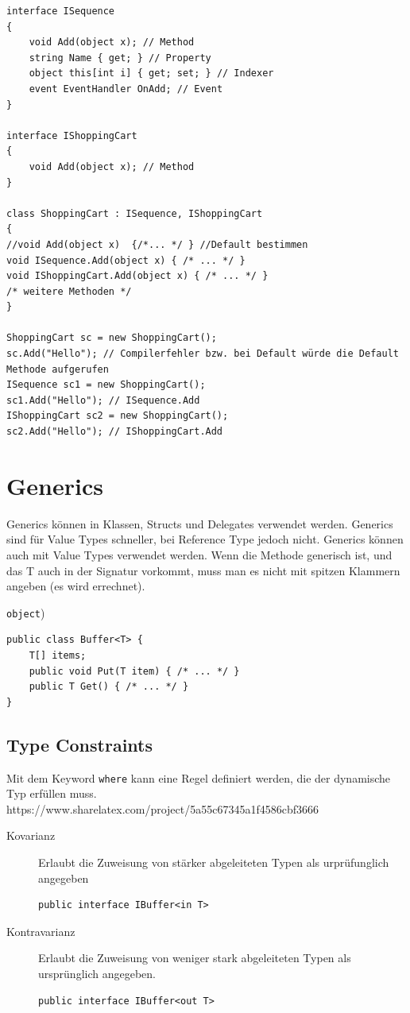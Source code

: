 \documentclass[
a4paper,
oneside,
10pt,
fleqn,
headsepline,
toc=listofnumbered, 
bibliography=totocnumbered]{scrartcl}
\let\stdsection\section
\renewcommand\section{\clearpage\stdsection}
\begin{document}
\begin{lstlisting}
interface ISequence
{
    void Add(object x); // Method
    string Name { get; } // Property
    object this[int i] { get; set; } // Indexer
    event EventHandler OnAdd; // Event
}

interface IShoppingCart
{
    void Add(object x); // Method
}

class ShoppingCart : ISequence, IShoppingCart
{
//void Add(object x)  {/*... */ } //Default bestimmen
void ISequence.Add(object x) { /* ... */ } 
void IShoppingCart.Add(object x) { /* ... */ } 
/* weitere Methoden */
}

ShoppingCart sc = new ShoppingCart(); 
sc.Add("Hello"); // Compilerfehler bzw. bei Default würde die Default Methode aufgerufen
ISequence sc1 = new ShoppingCart(); 
sc1.Add("Hello"); // ISequence.Add 
IShoppingCart sc2 = new ShoppingCart(); 
sc2.Add("Hello"); // IShoppingCart.Add
\end{lstlisting}


\section{Generics}
Generics können in Klassen, Structs und Delegates verwendet werden. Generics sind für Value Types schneller, bei Reference Type jedoch nicht. Generics können auch mit Value Types verwendet werden. Wenn die Methode generisch ist, und das T auch in der Signatur vorkommt, muss man es nicht mit spitzen Klammern angeben (es wird errechnet).

\lstinline|object|) 
\begin{lstlisting}
public class Buffer<T> {
	T[] items;
	public void Put(T item) { /* ... */ }
	public T Get() { /* ... */ }
}
\end{lstlisting}


\subsection{Type Constraints}
Mit dem Keyword \lstinline|where| kann eine Regel definiert werden, die der dynamische Typ erfüllen muss.
https://www.sharelatex.com/project/5a55c67345a1f4586cbf3666
\begin{description}
	\item[Kovarianz] Erlaubt die Zuweisung von stärker abgeleiteten Typen als urprüfunglich angegeben
\begin{lstlisting}
public interface IBuffer<in T>
\end{lstlisting}
	\item[Kontravarianz] Erlaubt die Zuweisung von weniger stark abgeleiteten Typen als ursprünglich angegeben.
\begin{lstlisting}
public interface IBuffer<out T>
\end{lstlisting}
\end{description}
\end{document}
